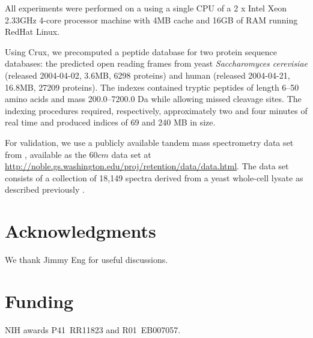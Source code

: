 \documentclass[12pt]{article}
\begin{document}
All experiments were performed on a using a single CPU of a 2 x Intel
Xeon 2.33GHz 4-core processor machine with 4MB cache and 16GB of RAM
running RedHat Linux.

Using Crux, we precomputed a peptide database for two protein sequence
databases: the predicted open reading frames from yeast {\em
Saccharomyces cerevisiae} (released 2004-04-02, 3.6MB, 6298 proteins)
and human (released 2004-04-21, 16.8MB, 27209 proteins).  The indexes
contained tryptic peptides of length 6--50 amino acids and mass
200.0--7200.0 Da while allowing missed cleavage sites.  The indexing
procedures required, respectively, approximately two and four minutes
of real time and produced indices of 69 and 240 MB in size.

For validation, we use a publicly available tandem mass spectrometry
data set from \cite{klammer:peptide2}, available as the $60cm$ data
set at
\url{http://noble.gs.washington.edu/proj/retention/data/data.html}.
The data set consists of a collection of 18,149 spectra derived from a
yeast whole-cell lysate as described previously
\cite{klammer:peptide2}.

\section*{Acknowledgments}
We thank Jimmy Eng for useful discussions.

\section*{Funding}
NIH awards P41~RR11823 and R01~EB007057.


 
\end{document}
